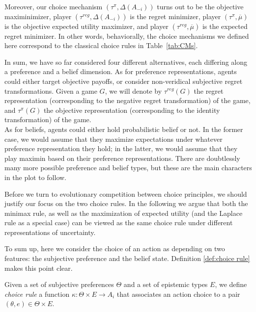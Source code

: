 \documentclass[fleqn,reqno,11pt]{article}
\begin{document}
Moreover, our choice mechanism $(\tau^{\pi}, \Delta(A_{-i}))$ turns out to be the objective
maximinimizer, player $(\tau^{reg}, \Delta(A_{-i}))$ is the regret minimizer, player
$(\tau^{\pi}, \overline{\mu})$ is the objective expected utility maximizer, and player
$(\tau^{reg}, \overline{\mu})$ is the expected regret minimizer. In other words, behaviorally,
the choice mechanisms we defined here correspond to the classical choice rules in
Table~\ref{tab:CMs}. 


\bigskip
\bigskip


\bigskip
\bigskip




In sum, we have so far considered four different alternatives, each differing along a
preference and a belief dimension. As for preference representations, agents could either
target objective payoffs, or consider non-veridical subjective regret transformations. Given a game $G$, we will denote by $ \tau^{reg}(G)$ the regret representation (corresponding to the negative regret transformation) of the game, and $\tau^{\pi}(G)$ the objective representation (corresponding to the identity transformation) of the game. \\
As for
beliefs, agents could either hold probabilistic belief or not. In the former case, we would
assume that they maximize expectations under whatever preference representation they hold; in
the latter, we would assume that they play maximin based on their preference
representations. There are doubtlessly many more possible preference and belief types, but
these are the main characters in the plot to follow. 

Before we turn to evolutionary competition between choice principles, we should justify our
focus on the two choice rules. In the following we argue that both the minimax rule, as well as the maximization of expected utility 
(and the Laplace rule as a special case) can be viewed as the same choice rule under different representations of
uncertainty. 


To sum up, here we consider the choice of an action as depending on two features: the subjective preference and the belief state. Definition \ref{def:choice rule} makes this point clear.

\begin{definition} \label{def:choice rule}

Given a set of subjective preferences $\Theta$ and a set of epistemic types $E$, we define \textit{choice rule} a function $\kappa: \Theta \times E  \rightarrow A_i$ that associates an action choice to a pair $(\theta, e) \in \Theta \times E$.

\end{definition}
\end{document}
